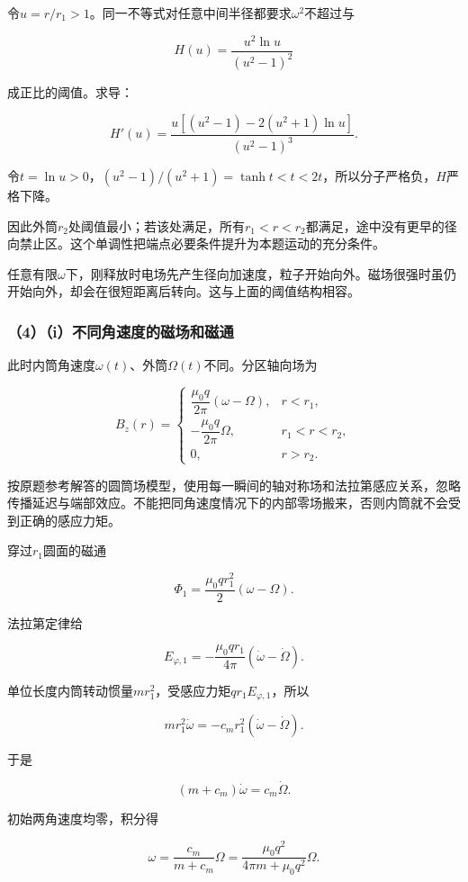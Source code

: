\documentclass[12pt,a4paper,fontset=fandol]{ctexart}
\begin{document}
令\(u=r/r_1>1\)。同一不等式对任意中间半径都要求\(\omega^2\)不超过与

\[
H(u)=\frac{u^2\ln u}{(u^2-1)^2}
\]

成正比的阈值。求导：

\[
H'(u)=\frac{u[(u^2-1)-2(u^2+1)\ln u]}
{(u^2-1)^3}.
\]

令\(t=\ln u>0\)，\((u^2-1)/(u^2+1)=\tanh t<t<2t\)，所以分子严格负，\(H\)严格下降。

因此外筒\(r_2\)处阈值最小；若该处满足，所有\(r_1<r<r_2\)都满足，途中没有更早的径向禁止区。这个单调性把端点必要条件提升为本题运动的充分条件。

任意有限\(\omega\)下，刚释放时电场先产生径向加速度，粒子开始向外。磁场很强时虽仍开始向外，却会在很短距离后转向。这与上面的阈值结构相容。

\subsubsection{（4）（i）不同角速度的磁场和磁通}\label{iux4e0dux540cux89d2ux901fux5ea6ux7684ux78c1ux573aux548cux78c1ux901a}

此时内筒角速度\(\omega(t)\)、外筒\(\Omega(t)\)不同。分区轴向场为

\[
B_z(r)=
\begin{cases}
\dfrac{\mu_0q}{2\pi}(\omega-\Omega),&r<r_1,\\
-\dfrac{\mu_0q}{2\pi}\Omega,&r_1<r<r_2,\\
0,&r>r_2.
\end{cases}
\]

按原题参考解答的圆筒场模型，使用每一瞬间的轴对称场和法拉第感应关系，忽略传播延迟与端部效应。不能把同角速度情况下的内部零场搬来，否则内筒就不会受到正确的感应力矩。

穿过\(r_1\)圆面的磁通

\[
\Phi_1=\frac{\mu_0q r_1^2}{2}(\omega-\Omega).
\]

法拉第定律给

\[
E_{\varphi,1}
=-\frac{\mu_0q r_1}{4\pi}(\dot\omega-\dot\Omega).
\]

单位长度内筒转动惯量\(m r_1^2\)，受感应力矩\(q r_1E_{\varphi,1}\)，所以

\[
m r_1^2\dot\omega
=-c_m r_1^2(\dot\omega-\dot\Omega).
\]

于是

\[
(m+c_m)\dot\omega=c_m\dot\Omega.
\]

初始两角速度均零，积分得

\[
\boxed{\omega=\frac{c_m}{m+c_m}\Omega
=\frac{\mu_0q^2}{4\pi m+\mu_0q^2}\Omega}.
\]
\end{document}
